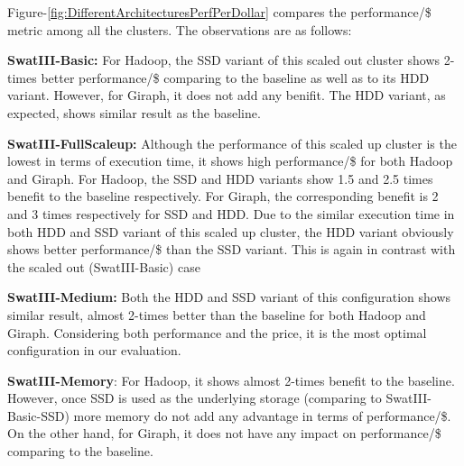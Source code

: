 \documentclass[conference]{IEEEtran}
\begin{document}
Figure-\ref{fig:DifferentArchitecturesPerfPerDollar} compares the performance/\$ metric among all the clusters. The observations are as follows:
\begin{inparaenum}[\itshape 1\upshape)]
\item \textbf{SwatIII-Basic:} For Hadoop, the SSD variant of this scaled out cluster shows 2-times better performance/\$ comparing to the baseline as well as to its HDD variant. However, for Giraph, it does not add any benifit. The HDD variant, as expected, shows similar result as the baseline.
\item \textbf{SwatIII-FullScaleup:} Although the performance of this scaled up cluster is the lowest in terms of execution time, it shows high performance/\$ for both Hadoop and Giraph. For Hadoop, the SSD and HDD variants show 1.5 and 2.5 times benefit to the baseline respectively. For Giraph, the corresponding benefit is 2 and 3 times respectively for SSD and HDD. Due to the similar execution time in both HDD and SSD variant of this scaled up cluster, the HDD variant obviously shows better performance/\$ than the SSD variant. This is again in contrast with the scaled out (SwatIII-Basic) case
\item \textbf{SwatIII-Medium:} Both the HDD and SSD variant of this configuration shows similar result, almost 2-times better than the baseline for both Hadoop and Giraph. Considering both performance and the price, it is the most optimal configuration in our evaluation.
\item \textbf{SwatIII-Memory}: For Hadoop, it shows almost 2-times benefit to the baseline. However, once SSD is used as the underlying storage (comparing to SwatIII-Basic-SSD) more memory do not add any advantage in terms of performance/\$. On the other hand, for Giraph, it does not have any impact on performance/\$ comparing to the baseline. 
\end{inparaenum}
\end{document}
